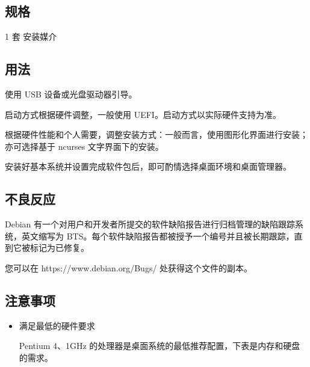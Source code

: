 \documentclass{article}
\begin{document}
\begin{multicols*}{3}
	\begin{tcolorbox}
	\section*{规格}
	\end{tcolorbox}

	1 套 安装媒介

	\medskip

	\begin{tcolorbox}
	\section*{用法}
	\end{tcolorbox}

	使用 USB 设备或光盘驱动器引导。

	启动方式根据硬件调整，一般使用 UEFI。启动方式以实际硬件支持为准。

	根据硬件性能和个人需要，调整安装方式：一般而言，使用图形化界面进行安装；亦可选择基于 ncurses 文字界面下的安装。

	安装好基本系统并设置完成软件包后，即可酌情选择桌面环境和桌面管理器。

	\medskip

	\begin{tcolorbox}
	\section*{不良反应}
	\end{tcolorbox}

	Debian 有一个对用户和开发者所提交的软件缺陷报告进行归档管理的缺陷跟踪系统，英文缩写为 BTS。每个软件缺陷报告都被授予一个编号并且被长期跟踪，直到它被标记为已修复。

	您可以在 https://www.debian.org/Bugs/ 处获得这个文件的副本。

	\medskip


	\begin{tcolorbox}
	\section*{注意事项}
	\end{tcolorbox}
	\begin{itemize}[leftmargin=*]

		\item 满足最低的硬件要求

		Pentium 4、1GHz 的处理器是桌面系统的最低推荐配置，下表是内存和硬盘的需求。


\end{itemize}
\end{multicols*}
\end{document}

